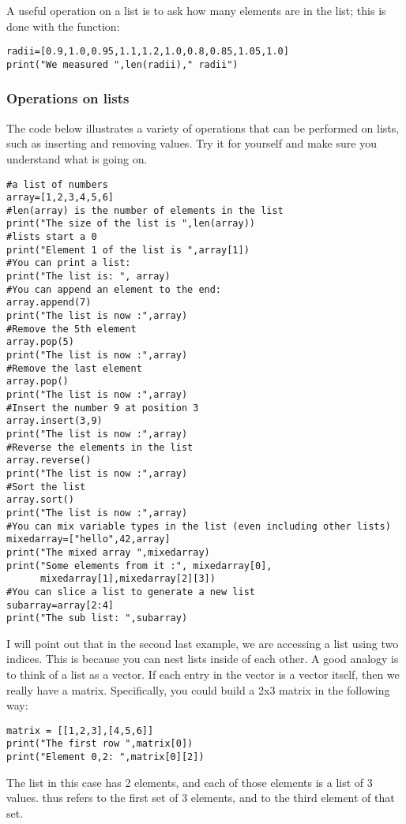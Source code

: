 A useful operation on a list is to ask how many elements are in the list; this is done with the  function:
\begin{lstlisting}[frame=single] 
radii=[0.9,1.0,0.95,1.1,1.2,1.0,0.8,0.85,1.05,1.0]
print("We measured ",len(radii)," radii")
\end{lstlisting}

\subsubsection{Operations on lists}
The code below illustrates a variety of operations that can be performed on lists, such as inserting and removing values. Try it for yourself and make sure you understand what is going on.
\begin{lstlisting}[frame=single] 
#a list of numbers
array=[1,2,3,4,5,6]
#len(array) is the number of elements in the list
print("The size of the list is ",len(array))
#lists start a 0
print("Element 1 of the list is ",array[1])
#You can print a list:
print("The list is: ", array)
#You can append an element to the end:
array.append(7)
print("The list is now :",array)
#Remove the 5th element
array.pop(5)
print("The list is now :",array)
#Remove the last element
array.pop()
print("The list is now :",array)
#Insert the number 9 at position 3
array.insert(3,9)
print("The list is now :",array)
#Reverse the elements in the list
array.reverse()
print("The list is now :",array)
#Sort the list
array.sort()
print("The list is now :",array)
#You can mix variable types in the list (even including other lists)
mixedarray=["hello",42,array]
print("The mixed array ",mixedarray)
print("Some elements from it :", mixedarray[0],
      mixedarray[1],mixedarray[2][3])
#You can slice a list to generate a new list
subarray=array[2:4]
print("The sub list: ",subarray)
\end{lstlisting}
I will point out that in the second last example, we are accessing a list using two indices. This is because you can nest lists inside of each other. A good analogy is to think of a list as a vector. If each entry in the vector is a vector itself, then we really have a matrix. Specifically, you could build a 2x3 matrix in the following way:
\begin{lstlisting}[frame=single] 
matrix = [[1,2,3],[4,5,6]]
print("The first row ",matrix[0])
print("Element 0,2: ",matrix[0][2])
\end{lstlisting}
The  list in this case has 2 elements, and each of those elements is a list of 3 values.  thus refers to the first set of 3 elements, and  to the third element of that set. 

